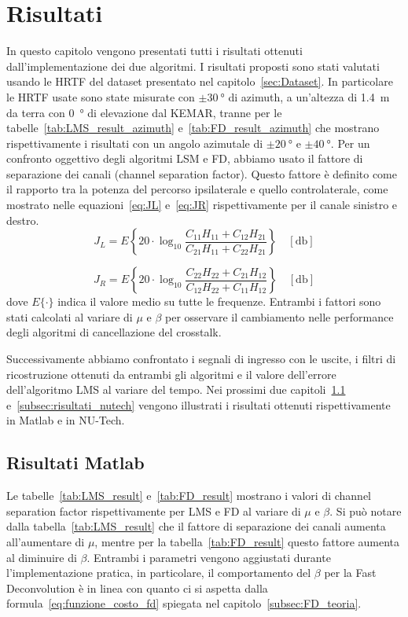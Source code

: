 \documentclass[12pt,a4paper,titlepage]{article}
\begin{document}
\section{Risultati}
\label{sec:risultati}
In questo capitolo vengono presentati tutti i risultati ottenuti dall'implementazione dei due algoritmi. I risultati proposti sono stati valutati usando le HRTF del dataset presentato nel capitolo~\ref{sec:Dataset}. In particolare le HRTF usate sono state misurate con $\pm \SI{30}{\degree}$ di azimuth, a un'altezza di \SI{1.4}{\meter} da terra con \SI{0}{\degree} di elevazione dal KEMAR, tranne per le tabelle~\ref{tab:LMS_result_azimuth} e~\ref{tab:FD_result_azimuth} che mostrano rispettivamente i risultati con un angolo azimutale di $\pm \SI{20}{\degree}$ e $\pm \SI{40}{\degree}$. Per un confronto oggettivo degli algoritmi LSM e FD, abbiamo usato il fattore di separazione dei canali (channel separation factor). Questo fattore è definito come il rapporto tra la potenza del percorso ipsilaterale e quello controlaterale, come mostrato nelle equazioni~\eqref{eq:JL} e~\eqref{eq:JR} rispettivamente per il canale sinistro e destro.
\begin{equation}\label{eq:JL}
J_L = E\left\{20\cdot\log_{10} \dfrac{C_{11}H_{11}+C_{12}H_{21}}{C_{21}H_{11}+C_{22}H_{21}}\right\} \quad [\si{\decibel}]
\end{equation}

\begin{equation}\label{eq:JR}
J_R = E\left\{20\cdot\log_{10} \dfrac{C_{22}H_{22}+C_{21}H_{12}}{C_{12}H_{22}+C_{11}H_{12}}\right\} \quad [\si{\decibel}]
\end{equation}
dove $E\{\cdot\}$ indica il valore medio su tutte le frequenze. Entrambi i fattori sono stati calcolati al variare di $\mu$ e $\beta$ per osservare il cambiamento nelle performance degli algoritmi di cancellazione del crosstalk.

Successivamente abbiamo confrontato i segnali di ingresso con le uscite, i filtri di ricostruzione ottenuti da entrambi gli algoritmi e il valore dell'errore dell'algoritmo LMS al variare del tempo. Nei prossimi due capitoli~\ref{subsec:risultati_matlab} e~\ref{subsec:risultati_nutech} vengono illustrati i risultati ottenuti rispettivamente in Matlab e in NU-Tech.

\subsection{Risultati Matlab}
\label{subsec:risultati_matlab}
Le tabelle~\ref{tab:LMS_result} e~\ref{tab:FD_result} mostrano i valori di channel separation factor rispettivamente per LMS e FD al variare di $\mu$ e $\beta$. Si può notare dalla tabella~\ref{tab:LMS_result} che il fattore di separazione dei canali aumenta all'aumentare di $\mu$, mentre per la tabella~\ref{tab:FD_result} questo fattore aumenta al diminuire di $\beta$. Entrambi i parametri vengono aggiustati durante l'implementazione pratica, in particolare, il comportamento del $\beta$ per la Fast Deconvolution è in linea con quanto ci si aspetta dalla formula~\eqref{eq:funzione_costo_fd} spiegata nel capitolo~\ref{subsec:FD_teoria}.
\end{document}
